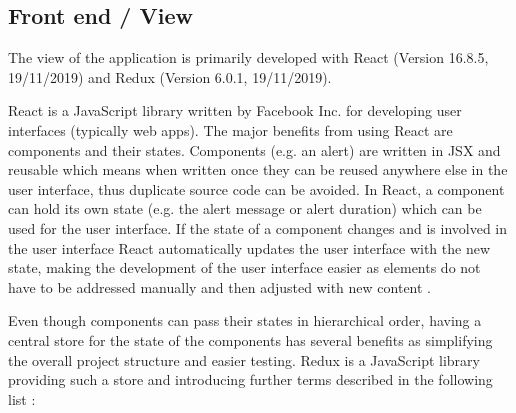 \subsection{Front end / View}
\label{sec:DomainCb}

The view of the application is primarily developed with React (Version 16.8.5, 19/11/2019) and Redux (Version 6.0.1, 19/11/2019).

React is a JavaScript library written by Facebook Inc. for developing user interfaces (typically web apps). The major benefits from using React are components and their states. Components (e.g. an alert) are written in \ac{JSX} and reusable which means when written once they can be reused anywhere else in the user interface, thus duplicate source code can be avoided. In React, a component can hold its own state (e.g. the alert message or alert duration) which can be used for the user interface. If the state of a component changes and is involved in the user interface React automatically updates the user interface with the new state, making the development of the user interface easier as elements do not have to be addressed manually and then adjusted with new content \cite[p. 7-8]{stefanovDurchstartenMitReact2017}.

Even though components can pass their states in hierarchical order, having a central store for the state of the components has several benefits as simplifying the overall project structure and easier testing. Redux is a JavaScript library providing such a store and introducing further terms described in the following list \cite[p. 531-534]{freemanProReact162019}:

